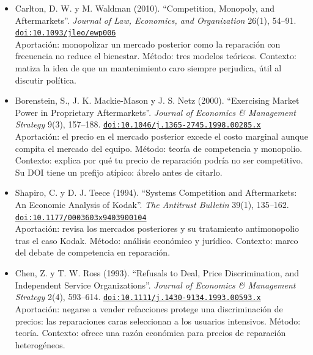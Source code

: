 \documentclass[11pt]{article}
\begin{document}
\begin{itemize}
Aportación: si el mantenimiento no se monopoliza, con costos de cambio algunos consumidores mantienen unidades que sería más eficiente reemplazar. Método: teoría de competencia. Contexto: trata directamente la disyuntiva entre mantener y reemplazar, la misma que tiene tu dueño de coche.
\item Carlton, D. W. y M. Waldman (2010). ``Competition, Monopoly, and Aftermarkets''. \textit{Journal of Law, Economics, and Organization} 26(1), 54--91. \href{https://doi.org/10.1093/jleo/ewp006}{\texttt{doi:10.1093/jleo/ewp006}}\\
Aportación: monopolizar un mercado posterior como la reparación con frecuencia no reduce el bienestar. Método: tres modelos teóricos. Contexto: matiza la idea de que un mantenimiento caro siempre perjudica, útil al discutir política.
\item Borenstein, S., J. K. Mackie-Mason y J. S. Netz (2000). ``Exercising Market Power in Proprietary Aftermarkets''. \textit{Journal of Economics \& Management Strategy} 9(3), 157--188. \href{https://doi.org/10.1046/j.1365-2745.1998.00285.x}{\texttt{doi:10.1046/j.1365-2745.1998.00285.x}}\\
Aportación: el precio en el mercado posterior excede el costo marginal aunque compita el mercado del equipo. Método: teoría de competencia y monopolio. Contexto: explica por qué tu precio de reparación podría no ser competitivo. Su DOI tiene un prefijo atípico: ábrelo antes de citarlo.
\item Shapiro, C. y D. J. Teece (1994). ``Systems Competition and Aftermarkets: An Economic Analysis of Kodak''. \textit{The Antitrust Bulletin} 39(1), 135--162. \href{https://doi.org/10.1177/0003603x9403900104}{\texttt{doi:10.1177/0003603x9403900104}}\\
Aportación: revisa los mercados posteriores y su tratamiento antimonopolio tras el caso Kodak. Método: análisis económico y jurídico. Contexto: marco del debate de competencia en reparación.
\item Chen, Z. y T. W. Ross (1993). ``Refusals to Deal, Price Discrimination, and Independent Service Organizations''. \textit{Journal of Economics \& Management Strategy} 2(4), 593--614. \href{https://doi.org/10.1111/j.1430-9134.1993.00593.x}{\texttt{doi:10.1111/j.1430-9134.1993.00593.x}}\\
Aportación: negarse a vender refacciones protege una discriminación de precios: las reparaciones caras seleccionan a los usuarios intensivos. Método: teoría. Contexto: ofrece una razón económica para precios de reparación heterogéneos.
\end{itemize}
\end{document}
